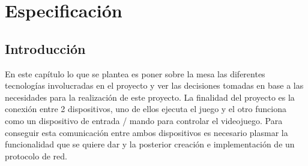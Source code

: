 %
%
%
%
%
%
%
%
%
%


\begin{FraseCelebre}
\begin{Frase}
\end{Frase}
\begin{Fuente}
\end{Fuente}
\end{FraseCelebre}


\chapter{Especificaci\'on}
\label{cap3}
\label{cap:especificacion}

\section{Introducci\'on}
\label{cap3:sec:intro}
En este cap\'itulo lo que se plantea es poner sobre la mesa las diferentes tecnolog\'ias involucradas en el proyecto y ver las decisiones tomadas en base a las necesidades para la realizaci\'on de este proyecto. La finalidad del proyecto es la conexi\'on entre 2 dispositivos, uno de ellos ejecuta el juego y el otro funciona como un dispositivo de entrada / mando para controlar el videojuego. 
Para conseguir esta comunicaci\'on entre ambos dispositivos es necesario plasmar la funcionalidad que se quiere dar y la posterior creaci\'on e implementaci\'on de un protocolo de red.


